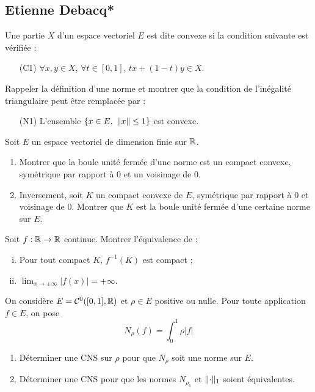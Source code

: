 \documentclass[10pt]{scrartcl}
\begin{document}
    \subsection*{Etienne Debacq*}
    \begin{exo}
        Une partie $X$ d'un espace vectoriel $E$ est dite convexe si la condition suivante est vérifiée : 
        \begin{itemize}
            \item[(C1)] $\forall x,y\in X$, $\forall t\in[0,1]$, $tx+(1-t)y\in X$.
        \end{itemize}
        Rappeler la définition d'une norme et montrer que la condition de l'inégalité triangulaire peut être remplacée par :
        \begin{itemize}
            \item[(N1)] L'ensemble $\lbrace x\in E,\ \lVert x\rVert\leq 1\rbrace$ est convexe.
        \end{itemize}

    \end{exo}
    \begin{exo}[Jauge !] Soit $E$ un espace vectoriel de dimension finie sur $\operatorname{\mathbb R}$.
        \begin{enumerate}
            \item Montrer que la boule unité fermée d'une norme est un compact convexe, symétrique par rapport à $0$ et un voisinage de $0$.
            \item Inversement, soit $K$ un compact convexe de $E$, symétrique par rapport à $0$ et voisinage de $0$. Montrer que $K$ est la boule unité fermée d'une certaine norme sur $E$.
        \end{enumerate}
    \end{exo}

    \begin{exo}
        Soit $f:\operatorname{\mathbb R}\to\operatorname{\mathbb R}$ continue. Montrer l'équivalence de :
        \begin{enumerate}[(i)]
            \item Pour tout compact $K$, $f^{-1}(K)$ est compact ;
            \item $\lim_{x\to \pm\infty}|f(x)|=+\infty$.
        \end{enumerate}
    \end{exo}

    \begin{exo}
        On considère $E=\mathcal C^0([0,1],\operatorname{\mathbb R})$ et $\rho\in E$ positive ou nulle. Pour toute application $f\in E$, on pose 
        \[
            N_\rho(f)=\int_0^1\rho|f|
        \]
        \begin{enumerate}
            \item Déterminer une CNS sur $\rho$ pour que $N_\rho$ soit une norme sur $E$.
            \item Déterminer une CNS pour que les normes $N_{\rho_1}$ et $\lVert \cdot\rVert_1$ soient équivalentes.
        \end{enumerate}
    \end{exo}
\end{document}
